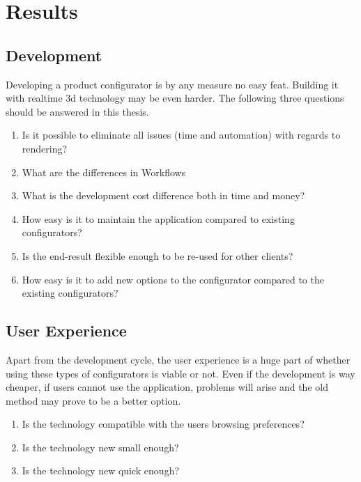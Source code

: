     
    
\chapter{Results}

\section{Development}
Developing a product configurator is by any measure no easy feat. Building it with realtime 3d technology may be even harder. The following three questions should be answered in this thesis.
​\begin{enumerate}
\item {Is it possible to eliminate all issues (time and automation) with regards to rendering?}
\item {What are the differences in Workflows}

\item {What is the development cost difference both in time and money?}
\item {How easy is it to maintain the application compared to existing configurators?}
\item {Is the end-result flexible enough to be re-used for other clients?}
\item {How easy is it to add new options to the configurator compared to the existing configurators?}
\end{enumerate}

\section{User Experience}
Apart from the development cycle, the user experience is a huge part of whether using these types of configurators is viable or not. Even if the development is way cheaper, if users cannot use the application, problems will arise and the old method may prove to be a better option.\begin{enumerate}
\item {Is the technology compatible with the users browsing preferences?}
\item {Is the technology new small enough?}
\item {Is the technology new quick enough?}
\end{enumerate}	




